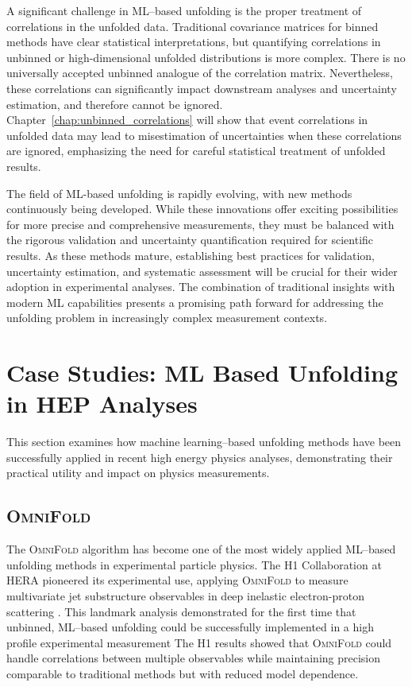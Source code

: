     A significant challenge in ML--based unfolding is the proper treatment of correlations in the unfolded data.
    Traditional covariance matrices for binned methods have clear statistical interpretations, but quantifying correlations in unbinned or high-dimensional unfolded distributions is more complex.
    There is no universally accepted unbinned analogue of the correlation matrix.
    Nevertheless, these correlations can significantly impact downstream analyses and uncertainty estimation, and therefore cannot be ignored.
    Chapter~\ref{chap:unbinned_correlations} will show that event correlations in unfolded data may lead to misestimation of uncertainties when these correlations are ignored, emphasizing the need for careful statistical treatment of unfolded results.

    The field of ML-based unfolding is rapidly evolving, with new methods continuously being developed.
    While these innovations offer exciting possibilities for more precise and comprehensive measurements, they must be balanced with the rigorous validation and uncertainty quantification required for scientific results.
    As these methods mature, establishing best practices for validation, uncertainty estimation, and systematic assessment will be crucial for their wider adoption in experimental analyses.
    The combination of traditional insights with modern ML capabilities presents a promising path forward for addressing the unfolding problem in increasingly complex measurement contexts.

\section{Case Studies: ML Based Unfolding in HEP Analyses}

This section examines how machine learning--based unfolding methods have been successfully applied in recent high energy physics analyses, demonstrating their practical utility and impact on physics measurements.

\subsection{\textsc{OmniFold}}  
    The \textsc{OmniFold} algorithm has become one of the most widely applied ML--based unfolding methods in experimental particle physics.
    The H1 Collaboration at HERA pioneered its experimental use, applying \textsc{OmniFold} to measure multivariate jet substructure observables in deep inelastic electron-proton scattering .
    This landmark analysis demonstrated for the first time that unbinned, ML--based unfolding could be successfully implemented in a high profile experimental measurement
    The H1 results showed that \textsc{OmniFold} could handle correlations between multiple observables while maintaining precision comparable to traditional methods but with reduced model dependence.

